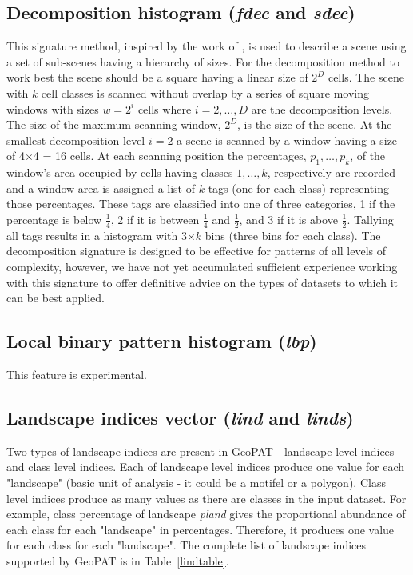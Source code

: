 \subsection{Decomposition histogram ({\it fdec} and {\it sdec})}

This signature method, inspired by the work of \cite{Remmel2006}, is used to describe a scene using a set of sub-scenes having a hierarchy of sizes. 
For the decomposition method to work best the scene should be a square having a linear size of $2^{D}$ cells.
The scene with $k$ cell classes is scanned without overlap by a series of square moving windows with sizes $w=2^{i}$ cells where $i=2, \ldots, D$ are the decomposition levels. 
The size of the maximum scanning window, $2^D$, is the size of the scene. 
At the smallest decomposition level $i=2$ a scene is scanned by a window having a size of 4$\times$4 = 16 cells. 
At each scanning position the percentages, ${p_1, \ldots, p_k}$, of the window's area occupied by cells having classes ${1, \ldots, k}$, respectively are recorded and a window area is assigned a list of $k$ tags (one for each class) representing those percentages. 
These tags are classified into one of three categories, 1 if the percentage is below $\frac{1}{4}$, 2 if it is between $\frac{1}{4}$ and $\frac{1}{2}$, and 3 if it is above $\frac{1}{2}$. 
Tallying all tags results in a histogram with 3$\times k$ bins (three bins for each class).  
The decomposition signature is designed to be effective for patterns of all levels of complexity, however, we have not yet accumulated sufficient experience working with this signature to offer definitive advice on the types of datasets to which it can be best applied. 

\subsection{Local binary pattern histogram ({\it lbp})}

This feature is experimental.

\subsection{Landscape indices vector ({\it lind} and {\it linds})}

Two types of landscape indices are present in GeoPAT - landscape level indices and class level indices.
Each of landscape level indices produce one value for each "landscape" (basic unit of analysis - it could be a motifel or a polygon).
Class level indices produce as many values as there are classes in the input dataset.
For example, class percentage of landscape {\it pland} gives the proportional abundance of each class for each "landscape" in percentages.
Therefore, it produces one value for each class for each "landscape". 
The complete list of landscape indices supported by GeoPAT is in Table~\ref{lindtable}.

